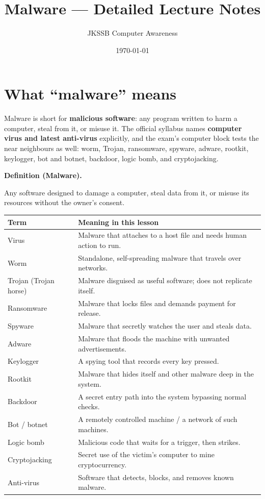 \documentclass[11pt]{article}
\title{Malware --- Detailed Lecture Notes}
\author{JKSSB Computer Awareness}
\date{\today}
\newenvironment{definitionbox}[1]{%
  \par\noindent\textbf{Definition (#1).}\ \itshape
}{\par\vspace{0.3em}}
\begin{document}
\maketitle

\section{What ``malware'' means}
Malware is short for \textbf{malicious software}: any program written to
harm a computer, steal from it, or misuse it. The official syllabus names
\textbf{computer virus and latest anti-virus} explicitly, and the exam's
computer block tests the near neighbours as well: worm, Trojan, ransomware,
spyware, adware, rootkit, keylogger, bot and botnet, backdoor, logic bomb,
and cryptojacking.

\begin{definitionbox}{Malware}
Any software designed to damage a computer, steal data from it, or misuse
its resources without the owner's consent.
\end{definitionbox}

\begin{center}
\begin{tabular}{p{}p{}}
\toprule
\textbf{Term} & \textbf{Meaning in this lesson} \\
\midrule
Virus & Malware that attaches to a host file and needs human action to run. \\
Worm & Standalone, self-spreading malware that travels over networks. \\
Trojan (Trojan horse) & Malware disguised as useful software; does not replicate itself. \\
Ransomware & Malware that locks files and demands payment for release. \\
Spyware & Malware that secretly watches the user and steals data. \\
Adware & Malware that floods the machine with unwanted advertisements. \\
Keylogger & A spying tool that records every key pressed. \\
Rootkit & Malware that hides itself and other malware deep in the system. \\
Backdoor & A secret entry path into the system bypassing normal checks. \\
Bot / botnet & A remotely controlled machine / a network of such machines. \\
Logic bomb & Malicious code that waits for a trigger, then strikes. \\
Cryptojacking & Secret use of the victim's computer to mine cryptocurrency. \\
Anti-virus & Software that detects, blocks, and removes known malware. \\
\bottomrule
\end{tabular}
\end{center}
\end{document}
